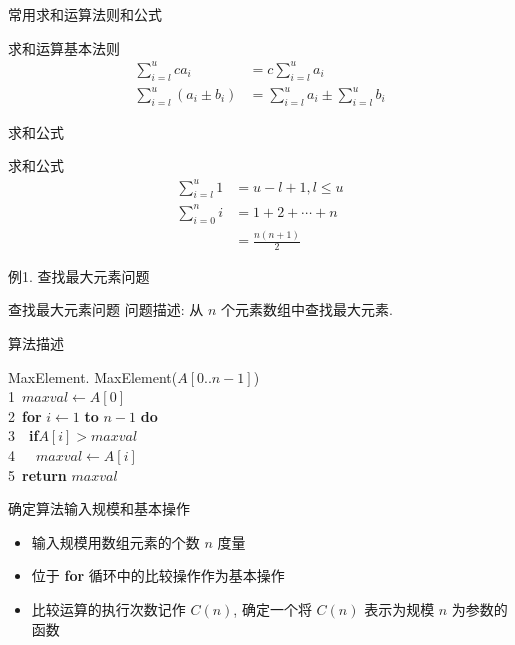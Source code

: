 \documentclass[fontset=fandol,UTF8,12pt,aspectratio=169,fleqn]{beamer}
\begin{document}
\begin{frame}{常用求和运算法则和公式}
  \begin{exampleblock}{求和运算基本法则}
\begin{align}
  \sum_{i=l}^{u}ca_i & =  c\sum_{i=l}^{u}a_i\\
  \sum_{i=l}^{u}(a_i\pm b_i) & =    \sum_{i=l}^{u}a_i\pm   \sum_{i=l}^{u}b_i
\end{align}
\end{exampleblock}
\end{frame}

\begin{frame}{求和公式}
  \begin{exampleblock}{求和公式}
    \begin{align}
\sum_{i=l}^{u}1 & =  u-l+1, l\leq u\\
      \sum_{i=0}^{n}i & =  1+2+\cdots + n \nonumber\\
                & =  \frac{n(n+1)}{2} 
    \end{align}
  \end{exampleblock}
\end{frame}

\begin{frame}{例1. 查找最大元素问题}
  \begin{exampleblock}{查找最大元素问题}
   问题描述: 从 $n$ 个元素数组中查找最大元素.
  \end{exampleblock}
\end{frame}

\begin{frame}{算法描述}
  \begin{exampleblock}{MaxElement.}
      MaxElement($A[0..n-1]$)\\
1\qquad\  $maxval \gets A[0]$\\
2\qquad\ \textbf{for} $i\gets 1$ \textbf{to} $n-1$ \textbf{do}\\
3\qquad\ \qquad\ \textbf{if}\underline{$A[i] > maxval$}\\
4\qquad\ \qquad\  \qquad\ $maxval \gets A[i]$\\
5\qquad\ \textbf{return} $maxval$ 
\end{exampleblock}
\end{frame}

\begin{frame}{确定算法输入规模和基本操作}
\begin{itemize}[<+-|alert@+>]
\item 输入规模用数组元素的个数 $n$ 度量  
\item 位于 \textbf{for} 循环中的比较操作作为基本操作  
\item 比较运算的执行次数记作 $C(n)$, 确定一个将 $C(n)$ 表示为规模 $n$ 为参数的函数 
\end{itemize}
\end{frame}
\end{document}
